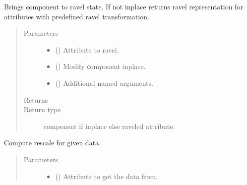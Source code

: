 \documentclass[letterpaper,10pt,english]{sphinxmanual}
\begin{document}
\begin{fulllineitems}
\begin{fulllineitems}
\label{\detokenize{api/states:geology.src.States.ravel}}
Brings component to ravel state. If not inplace returns
ravel representation for attributes with pre\sphinxhyphen{}defined ravel transformation.
\begin{quote}\begin{description}
\item[{Parameters}] \leavevmode\begin{itemize}
\item {} 
 (\sphinxstyleliteralemphasis{\sphinxupquote{, }}) \textendash{} Attribute to ravel.

\item {} 
 () \textendash{} Modify сomponent inplace.

\item {} 
 () \textendash{} Additional named arguments.

\end{itemize}

\item[{Returns}] \leavevmode
{}

\item[{Return type}] \leavevmode
component if inplace else raveled attribute.

\end{description}\end{quote}

\end{fulllineitems}


\begin{fulllineitems}
\label{\detokenize{api/states:geology.src.States.rescale}}
Compute rescale for given data.
\begin{quote}\begin{description}
\item[{Parameters}] \leavevmode\begin{itemize}
\item {} 
 (\sphinxstyleliteralemphasis{\sphinxupquote{, }}) \textendash{} Attribute to get the data from.


\end{itemize}
\end{description}
\end{quote}
\end{fulllineitems}
\end{fulllineitems}
\end{document}
